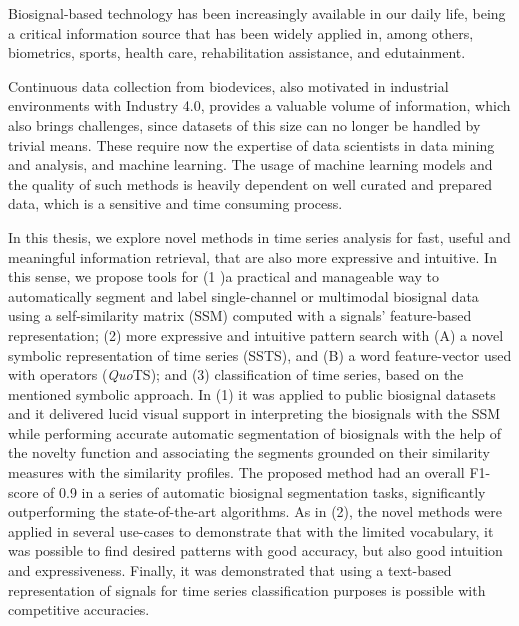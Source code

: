 
%

Biosignal-based technology has been increasingly available in our daily life, being a critical information source that has been widely applied in, among others, biometrics, sports, health care, rehabilitation assistance, and edutainment.

Continuous data collection from biodevices, also motivated in industrial environments with Industry 4.0, provides a valuable volume of information, which also brings challenges, since datasets of this 
size can no longer be handled by trivial means. These require now the expertise of data scientists in data mining and analysis, and machine learning. The usage of machine learning models and the quality of such methods is heavily dependent on well curated and prepared data, which is a sensitive and time consuming process. 

In this thesis, we explore novel methods in time series analysis for fast, useful and meaningful information retrieval, that are also more expressive and intuitive. In this sense, we propose tools for (1 )a practical and manageable way to automatically segment and label single-channel or multimodal biosignal data using a self-similarity matrix (SSM) computed with a signals' feature-based representation; (2) more expressive and intuitive pattern search with (A) a novel symbolic representation of time series (SSTS), and (B) a word feature-vector used with operators (\textit{Quo}TS); and (3) classification of time series, based on the mentioned symbolic approach. In (1) it was applied to public biosignal datasets and it delivered lucid visual support in interpreting the biosignals with the SSM while performing accurate automatic segmentation of biosignals with the help of the novelty function and associating the segments grounded on their similarity measures with the similarity profiles. The proposed method had an overall F1-score of 0.9 in a series of automatic biosignal segmentation tasks, significantly outperforming the state-of-the-art algorithms. As in (2), the novel methods were applied in several use-cases to demonstrate that with the limited vocabulary, it was possible to find desired patterns with good accuracy, but also good intuition and expressiveness. Finally, it was demonstrated that using a text-based representation of signals for time series classification purposes is possible with competitive accuracies.





